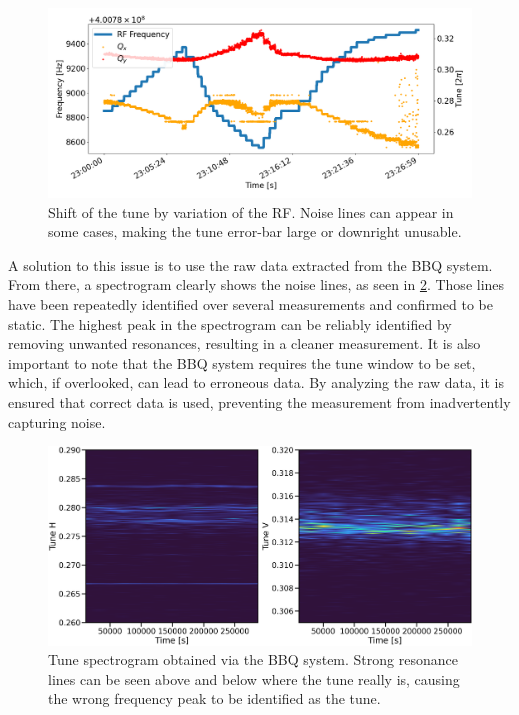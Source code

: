 \begin{figure}[!htb]
    \centering
    \includegraphics[width=\textwidth]{./images/noisy_tune.png}
    \caption{Shift of the tune by variation of the RF. Noise lines can appear in some cases,
    making the tune error-bar large or downright unusable.}
    \label{fig:decapoles:chromaticity:noisy_tune}
\end{figure}

A solution to this issue is to use the raw data extracted from the BBQ system. From there, a
spectrogram clearly shows the noise lines, as seen in \cref{fig:decapoles:chromaticity:spectrogram}.
Those lines have been repeatedly identified over several measurements and confirmed to be static.
The highest peak in the spectrogram can be reliably identified by removing unwanted resonances,
resulting in a cleaner measurement. It is also important to note that the BBQ system requires the
tune window to be set, which, if overlooked, can lead to erroneous data. By analyzing the raw data,
it is ensured that correct data is used, preventing the measurement from inadvertently capturing
noise.

\begin{figure}[!htb]
    \centering
    \includegraphics[width=.8\textwidth]{./images/spectrogram.png}
    \caption{Tune spectrogram obtained via the BBQ system. Strong resonance lines can be seen above and
    below where the tune really is, causing the wrong frequency peak to be identified as the tune.}
    \label{fig:decapoles:chromaticity:spectrogram}
\end{figure}




